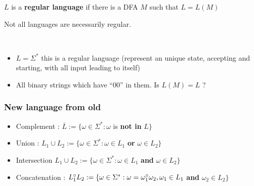 \documentclass[12pt,a4paper]{article}
\newcommand{\<}{\langle}
\renewcommand{\>}{\rangle}
\begin{document}
\begin{boite}
	\centering
	$L$ is a \textbf{regular language} if there is a DFA $M$ such that $L = L(M)$
\end{boite}
Not all languages are necessarily regular. 
\begin{exemple}~
	\begin{itemize}
		\item	$L = \Sigma^*$ this is a regular language (represent an unique state, accepting and starting, with all input leading to itself)
		\item 	All binary strings which have ``00'' in them.
				Is $L(M) = L$ ? 
	\end{itemize}
\end{exemple}
\subsubsection*{New language from old}
\begin{itemize}
	\item 	Complement : $\overline{L} := \{\omega \in \Sigma^* : \omega$ is \textbf{not in} $L\}$
	\item 	Union : $L_1 \cup L_2 := \{\omega \in \Sigma^* : \omega \in L_1$ \textbf{or} $\omega \in L_2\}$
	\item 	Intersection $L_1 \cup L_2 := \{\omega \in \Sigma^* : \omega \in L_1$ \textbf{and} $\omega \in L_2\}$
	\item 	Concatenation : $L_1 ^\circ L_2 := \{\omega \in \Sigma^* : \omega = \omega_1 ^\circ \omega_2, \omega_1 \in L_1$ \textbf{and} $\omega_2 \in L_2\}$
\end{itemize}
\end{document}
